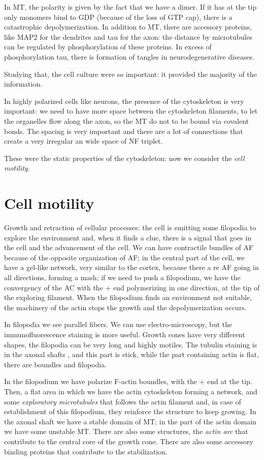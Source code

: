 \documentclass[a4paper, 12pt]{book}
\begin{document}
In MT, the polarity is given by the fact that we have a dimer. If it has at the tip only monomers bind to GDP (because of the loss of GTP cap), there is a catastrophic depolymerization. In addition to MT, there are accessory proteins, like MAP2 for the dendrites and tau for the axon: the distance by microtubules can be regulated by phosphorylation of these proteins. In excess of phosphorylation tau, there is formation of tangles in neurodegenerative diseases.

Studying that, the cell culture were so important: it provided the majority of the information.

In highly polarized cells like neurons, the presence of the cytoskeleton is very important: we need to have more space between the cytoskeleton filaments, to let the organelles flow along the axon, so the MT do not to be bound via covalent bonds. The spacing is very important and there are a lot of connections that create a very irregular an wide space of NF triplet.

These were the static properties of the cytoskeleton: now we consider the \emph{cell motility}.

\section{Cell motility}
Growth and retraction of cellular processes: the cell is emitting some filopodia to explore the environment and, when it finds a clue, there is a signal that goes in the cell and the advancement of the cell. We can have contractile bundles of AF because of the opposite organization of AF; in the central part of the cell, we have a gel-like network, very similar to the cortex, because there a re AF going in all directions, forming a mash; if we need to push a filopodium, we have the convergency of the AC with the + end polymerizing in one direction, at the tip of the exploring filament. When the filopodium finds an environment not suitable, the machinery of the actin stops the growth and the depolymerization occurs.

In filopodia we see parallel fibers. We can use electro-microscopy, but the immunofluorescence staining is more useful. Growth cones have very different shapes, the filopodia can be very long and highly motiles. The tubulin staining is in the axonal shafts , and this part is stick, while the part containing actin is flat, there are boundles and filopodia.

In the filopodium we have polarize F-actin boundles, with the + end at the tip. Then, a flat area in which we have the actin cytoskeleton forming  a network, and some \emph{exploratory microtubules} that follows the actin filament and, in case of establishment of this filopodium, they reinforce the structure to keep growing. In the axonal shaft we have a stable domain of MT; in the part of the actin domain we have some unstable MT. There are also some structures, the \emph{actin arc} that contribute to the central core of the growth cone. There are also some accessory binding proteins that contribute to the stabilization.
\end{document}
